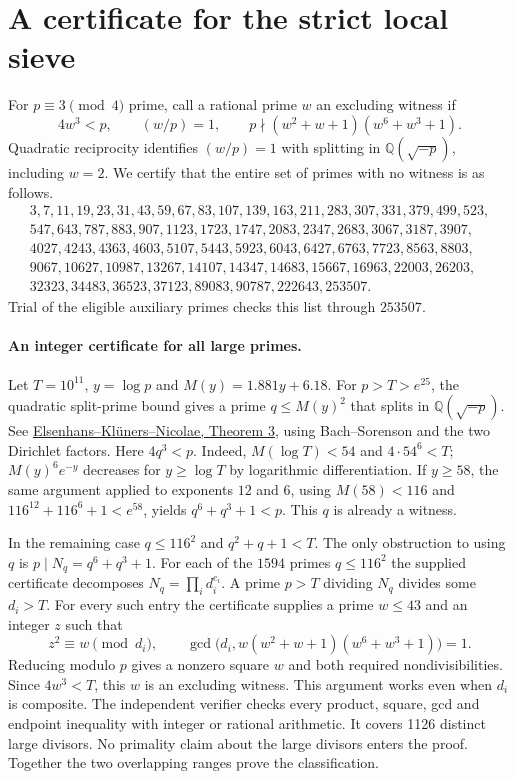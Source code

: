\section{A certificate for the strict local sieve}
\label{sec:strict-cc}
For $p\equiv3\pmod4$ prime, call a rational prime $w$ an excluding witness if
\[
   4w^3<p,\qquad (w/p)=1,\qquad
   p\nmid (w^2+w+1)(w^6+w^3+1).
\]
Quadratic reciprocity identifies $(w/p)=1$ with splitting in
$\mathbb Q(\sqrt{-p})$, including $w=2$. We certify that the entire set
of primes with no witness is as follows.
\[
\begin{gathered}
3,7,11,19,23,31,43,59,67,83,107,139,163,211,283,307,331,379,499,523,\\
547,643,787,883,907,1123,1723,1747,2083,2347,2683,3067,3187,3907,\\
4027,4243,4363,4603,5107,5443,5923,6043,6427,6763,7723,8563,8803,\\
9067,10627,10987,13267,14107,14347,14683,15667,16963,22003,26203,\\
32323,34483,36523,37123,89083,90787,222643,253507 .
\end{gathered}
\]
Trial of the eligible auxiliary primes checks this list through $253507$.


\paragraph{An integer certificate for all large primes.}
Let $T=10^{11}$, $y=\log p$ and $M(y)=1.881y+6.18$.
For $p>T>e^{25}$, the quadratic split-prime bound gives a prime
$q\le M(y)^2$ that splits in $\mathbb Q(\sqrt{-p})$. See
\href{https://arxiv.org/pdf/1803.02056}{Elsenhans--Kl\"uners--Nicolae,
Theorem 3}, using Bach--Sorenson and the two Dirichlet factors.
Here $4q^3<p$. Indeed, $M(\log T)<54$ and $4\cdot54^6<T$;
$M(y)^6e^{-y}$ decreases for $y\ge\log T$ by logarithmic differentiation.
If $y\ge58$, the same argument applied to exponents $12$ and $6$, using
$M(58)<116$ and $116^{12}+116^6+1<e^{58}$, yields $q^6+q^3+1<p$.
This $q$ is already a witness.

In the remaining case $q\le116^2$ and $q^2+q+1<T$. The only obstruction
to using $q$ is $p\mid N_q=q^6+q^3+1$. For each of the $1594$ primes
$q\le116^2$ the supplied certificate decomposes $N_q=\prod_i d_i^{e_i}$.
A prime $p>T$ dividing $N_q$ divides some $d_i>T$. For every such entry
the certificate supplies a prime $w\le43$ and an integer $z$ such that
\[
 z^2\equiv w\pmod {d_i},\qquad
 \gcd\bigl(d_i,w(w^2+w+1)(w^6+w^3+1)\bigr)=1 .
\]
Reducing modulo $p$ gives a nonzero square $w$ and both required
nondivisibilities. Since $4w^3<T$, this $w$ is an excluding witness.
This argument works even when $d_i$ is composite. The independent
verifier checks every product, square, gcd and endpoint inequality with
integer or rational arithmetic. It covers 1126 distinct large divisors.
No primality claim about the large divisors enters the proof.
Together the two overlapping ranges prove the classification.
